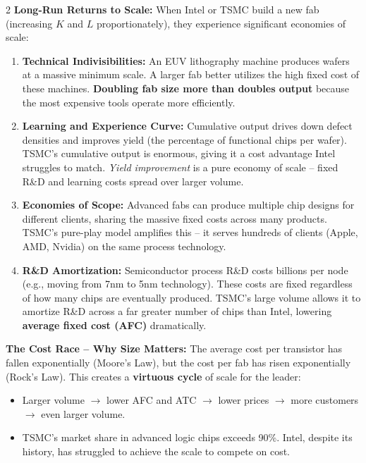\documentclass[10pt,a4paper]{article}
\begin{document}
\begin{multicols}{2}
\textbf{Long-Run Returns to Scale:}
When Intel or TSMC build a new fab (increasing $K$ and $L$ proportionately), they experience significant economies of scale:

\begin{enumerate}[leftmargin=*,nosep]
    \item \textbf{Technical Indivisibilities:} An EUV lithography machine produces wafers at a massive minimum scale. A larger fab better utilizes the high fixed cost of these machines. \textbf{Doubling fab size more than doubles output} because the most expensive tools operate more efficiently.
    \item \textbf{Learning and Experience Curve:} Cumulative output drives down defect densities and improves yield (the percentage of functional chips per wafer). TSMC's cumulative output is enormous, giving it a cost advantage Intel struggles to match. \textit{Yield improvement} is a pure economy of scale -- fixed R\&D and learning costs spread over larger volume.
    \item \textbf{Economies of Scope:} Advanced fabs can produce multiple chip designs for different clients, sharing the massive fixed costs across many products. TSMC's pure-play model amplifies this -- it serves hundreds of clients (Apple, AMD, Nvidia) on the same process technology.
    \item \textbf{R\&D Amortization:} Semiconductor process R\&D costs billions per node (e.g., moving from 7nm to 5nm technology). These costs are fixed regardless of how many chips are eventually produced. TSMC's large volume allows it to amortize R\&D across a far greater number of chips than Intel, lowering \textbf{average fixed cost (AFC)} dramatically.
\end{enumerate}

\textbf{The Cost Race -- Why Size Matters:}
The average cost per transistor has fallen exponentially (Moore's Law), but the cost per fab has risen exponentially (Rock's Law). This creates a \textbf{virtuous cycle} of scale for the leader:
\begin{itemize}[leftmargin=*,nosep]
    \item Larger volume $\to$ lower AFC and ATC $\to$ lower prices $\to$ more customers $\to$ even larger volume.
    \item TSMC's market share in advanced logic chips exceeds 90\%. Intel, despite its history, has struggled to achieve the scale to compete on cost.
\end{itemize}


\end{multicols}
\end{document}
